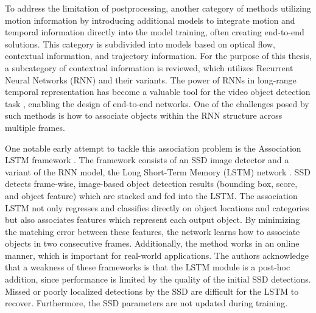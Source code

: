 
To address the limitation of postprocessing, another category of methods utilizing motion information by introducing additional models to integrate motion and temporal information directly into the model training, often creating end-to-end solutions. This category is subdivided into models based on optical flow, contextual information, and trajectory information. For the purpose of this thesis, a subcategory of contextual information is reviewed, which utilizes Recurrent Neural Networks (RNN) and their variants. The power of RNNs in long-range temporal representation has become a valuable tool for the video object detection task \cite{Lu_2017_ICCV, xiaoVideoObjectDetection2018, liuMobileVideoObject2018}, enabling the design of end-to-end networks. One of the challenges posed by such methods is how to associate objects within the RNN structure across multiple frames.

One notable early attempt to tackle this association problem is the Association LSTM framework \cite{Lu_2017_ICCV}. The framework consists of an SSD image detector \cite{liuSSDSingleShot2016} and a variant of the RNN model, the Long Short-Term Memory (LSTM) network \cite{6795963}. SSD detects frame-wise, image-based object detection results (bounding box, score, and object feature) which are stacked and fed into the LSTM. The association LSTM not only regresses and classifies directly on object locations and categories but also associates features which represent each output object. By minimizing the matching error between these features, the network learns how to associate objects in two consecutive frames. Additionally, the method works in an online manner, which is important for real-world applications. The authors acknowledge that a weakness of these frameworks is that the LSTM module is a post-hoc addition, since performance is limited by the quality of the initial SSD detections. Missed or poorly localized detections by the SSD are difficult for the LSTM to recover. Furthermore, the SSD parameters are not updated during training.



